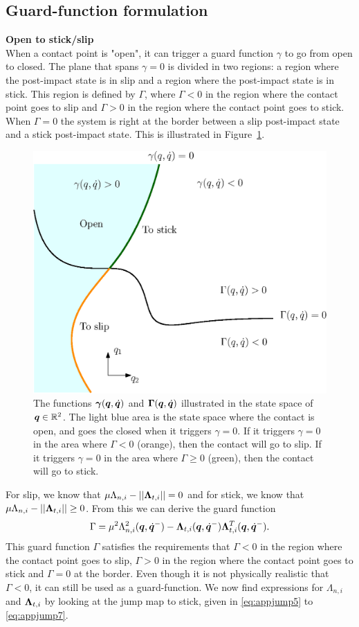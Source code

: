 \documentclass[DC2017114Bouma.tex]{subfiles}
\begin{document}
\subsection{Guard-function formulation}\label{app:guards}
\textbf{Open to stick/slip}\\
When a contact point is "open", it can trigger a guard function $\gamma$ to go from open to closed. The plane that spans $\gamma = 0$ is divided in two regions: a region where the post-impact state is in slip and a region where the post-impact state is in stick. This region is defined by $\Gamma$, where $\Gamma<0$ in the region where the contact point goes to slip and $\Gamma > 0$ in the region where the contact point goes to stick. When $\Gamma = 0$ the system is right at the border between a slip post-impact state and a stick post-impact state. This is illustrated in Figure~\ref{fig:guardopcl}. 

\begin{figure}[H]
	\centering
	\includegraphics[width=.7\textwidth]{guardopcl.eps}\caption{The functions $\boldsymbol{\gamma}({\boldsymbol{q}},\dot{{\boldsymbol{q}}})$ and $\boldsymbol{\Gamma}({\boldsymbol{q}},\dot{{\boldsymbol{q}}})$ illustrated in the state space of ${\boldsymbol{q}}\in\mathbb{R}^{2}$. The light blue area is the state space where the contact is open, and goes the closed when it triggers $\gamma = 0$. If it triggers $\gamma = 0$ in the area where $\Gamma<0$ (orange), then the contact will go to slip. If it triggers $\gamma=0$ in the area where $\Gamma\geq 0$ (green), then the contact will go to stick.}\label{fig:guardopcl}
\end{figure}

For slip, we know that $\mu\Lambda_{n,i} - ||\boldsymbol{\Lambda}_{t,i}|| = 0$ and for stick, we know that  $\mu\Lambda_{n,i} - ||\boldsymbol{\Lambda}_{t,i}|| \geq 0$. From this we can derive the guard function
\begin{align}
\Gamma = \mu^2 \Lambda_{n,i}^2({\boldsymbol{q}},\dot{{\boldsymbol{q}}}^-) - \boldsymbol{\Lambda}_{t,i}({\boldsymbol{q}},\dot{{\boldsymbol{q}}}^-)\boldsymbol{\Lambda}_{t,i}^T({\boldsymbol{q}},\dot{{\boldsymbol{q}}}^-). \label{eq:slipset}
\end{align}
This guard function $\Gamma$ satisfies the requirements that $\Gamma<0$ in the region where the contact point goes to slip, $\Gamma > 0$ in the region where the contact point goes to stick and $\Gamma = 0$ at the border. Even though it is not physically realistic that $\Gamma < 0$, it can still be used as a guard-function.
We now find expressions for $\Lambda_{n,i}$ and $\boldsymbol{\Lambda}_{t,i}$ by looking at the jump map to stick, given in \eqref{eq:appjump5} to \eqref{eq:appjump7}.
\end{document}
